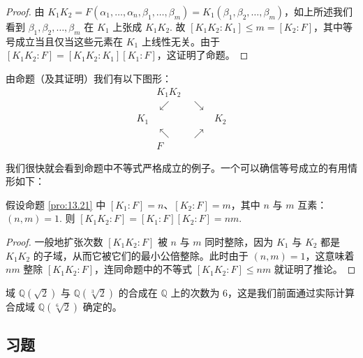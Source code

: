 \begin{proof}
由 \(K_1K_2 = F(\alpha_1, \ldots, \alpha_n, \beta_1, \ldots, \beta_m) = K_1(\beta_1, \beta_2, \ldots, \beta_m)\)，如上所述我们看到 \(\beta_1, \beta_2, \ldots, \beta_m\) 在 \(K_1\) 上张成 \(K_1K_2\). 故 \([K_1K_2:K_1] \leq m = [K_2:F]\)，其中等号成立当且仅当这些元素在 \(K_1\) 上线性无关。由于 \([K_1K_2:F] = [K_1K_2:K_1][K_1:F]\)，这证明了命题。
\end{proof}

由命题（及其证明）我们有以下图形：
\[
\begin{array}{ccc}
& K_1K_2 & \\
& \swarrow\hspace{2em}\searrow & \\
K_1 & & K_2\\
& \nwarrow\hspace{2em}\nearrow & \\
& F &
\end{array}
\]

我们很快就会看到命题中不等式严格成立的例子。一个可以确信等号成立的有用情形如下：

\begin{corollary}\label{cor:13.22}
假设命题 \ref{pro:13.21} 中 \([K_1:F] = n\)、\([K_2:F] = m\)，其中 \(n\) 与 \(m\) 互素：\((n, m) = 1\). 则 \([K_1K_2:F] = [K_1:F][K_2:F] = nm\).
\end{corollary}

\begin{proof}
一般地扩张次数 \([K_1K_2:F]\) 被 \(n\) 与 \(m\) 同时整除，因为 \(K_1\) 与 \(K_2\) 都是 \(K_1K_2\) 的子域，从而它被它们的最小公倍整除。此时由于 \((n, m) = 1\)，这意味着 \(nm\) 整除 \([K_1K_2:F]\)，连同命题中的不等式 \([K_1K_2:F] \leq nm\) 就证明了推论。
\end{proof}

\begin{example}
域 \(\mathbb{Q}(\sqrt{2})\) 与 \(\mathbb{Q}(\sqrt[3]{2})\) 的合成在 \(\mathbb{Q}\) 上的次数为 6，这是我们前面通过实际计算合成域 \(\mathbb{Q}(\sqrt[6]{2})\) 确定的。
\end{example}

\subsection*{习题}

